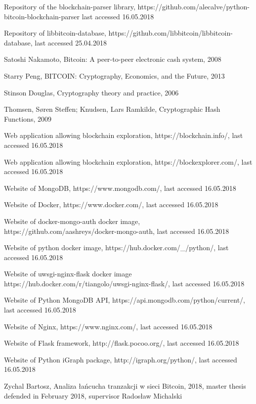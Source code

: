 \documentclass[12pt, en, eng, twoside, final]{mgr}
\begin{document}
\begin{thebibliography}{9}
Repository of the blockchain-parser library, https://github.com/alecalve/python-bitcoin-blockchain-parser last accessed 16.05.2018 

Repository of libbitcoin-database, https://github.com/libbitcoin/libbitcoin-database, last accessed 25.04.2018

Satoshi Nakamoto, Bitcoin: A peer-to-peer electronic cash system, 2008

Starry Peng, BITCOIN: Cryptography, Economics, and the Future, 2013

Stinson Douglas, Cryptography theory and practice, 2006

Thomsen, Søren Steffen; Knudsen, Lars Ramkilde, Cryptographic Hash Functions, 2009

Web application allowing blockchain exploration, https://blockchain.info/, last accessed 16.05.2018

Web application allowing blockchain exploration, https://blockexplorer.com/, last accessed 16.05.2018

Website of MongoDB, https://www.mongodb.com/, last accessed 16.05.2018

Website of Docker, https://www.docker.com/, last accessed 16.05.2018

Website of docker-mongo-auth docker image, https://github.com/aashreys/docker-mongo-auth, last accessed 16.05.2018

Website of python docker image, https://hub.docker.com/\_/python/, last accessed 16.05.2018

Website of uwsgi-nginx-flask docker image https://hub.docker.com/r/tiangolo/uwsgi-nginx-flask/, last accessed 16.05.2018

Website of Python MongoDB API, https://api.mongodb.com/python/current/, last accessed 16.05.2018

Website of Nginx, https://www.nginx.com/, last accessed 16.05.2018

Website of Flask framework, http://flask.pocoo.org/, last accessed 16.05.2018

Website of Python iGraph package, http://igraph.org/python/, last accessed 16.05.2018

Zychal Bartosz, Analiza łańcucha tranzakcji w sieci Bitcoin, 2018, master thesis defended in February 2018, supervisor Radosław Michalski

\end{thebibliography}



\lstlistoflistings

\listoffigures
\end{document}
